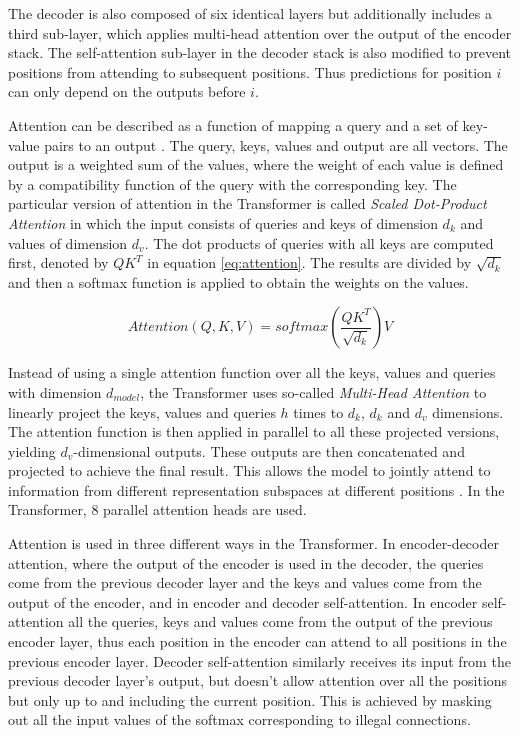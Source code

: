 The decoder is also composed of six identical layers but additionally includes a third sub-layer, which applies multi-head attention over the output of the encoder stack.
The self-attention sub-layer in the decoder stack is also modified to prevent positions from attending to subsequent positions.
Thus predictions for position $i$ can only depend on the outputs before $i$.

Attention can be described as a function of mapping a query and a set of key-value pairs to an output \cite{vaswani2017}.
The query, keys, values and output are all vectors.
The output is a weighted sum of the values, where the weight of each value is defined by a compatibility function of the query with the corresponding key.
The particular version of attention in the Transformer is called \textit{Scaled Dot-Product Attention} in which the input consists of queries and keys of dimension $d_k$ and values of dimension $d_v$.
The dot products of queries with all keys are computed first, denoted by $QK^T$ in equation \ref{eq:attention}.
The results are divided by $\sqrt{d_k}$ and then a softmax function is applied to obtain the weights on the values.


\begin{equation}
  Attention(Q,K,V)=softmax(\dfrac{{QK^T}}{{\sqrt{d_k}}})V\label{eq:attention}
\end{equation}

Instead of using a single attention function over all the keys, values and queries with dimension $d_{model}$, the Transformer uses so-called \textit{Multi-Head Attention} to linearly project the keys, values and queries $h$ times to $d_k$, $d_k$ and $d_v$ dimensions.
The attention function is then applied in parallel to all these projected versions, yielding $d_v$-dimensional outputs.
These outputs are then concatenated and projected to achieve the final result.
This allows the model to jointly attend to information from different representation subspaces at different positions \cite{vaswani2017}.
In the Transformer, 8 parallel attention heads are used.

Attention is used in three different ways in the Transformer.
In encoder-decoder attention, where the output of the encoder is used in the decoder, the queries come from the previous decoder layer and the keys and values come from the output of the encoder, and in encoder and decoder self-attention.
In encoder self-attention all the queries, keys and values come from the output of the previous encoder layer, thus each position in the encoder can attend to all positions in the previous encoder layer.
Decoder self-attention similarly receives its input from the previous decoder layer's output, but doesn't allow attention over all the positions but only up to and including the current position.
This is achieved by masking out all the input values of the softmax corresponding to illegal connections.

